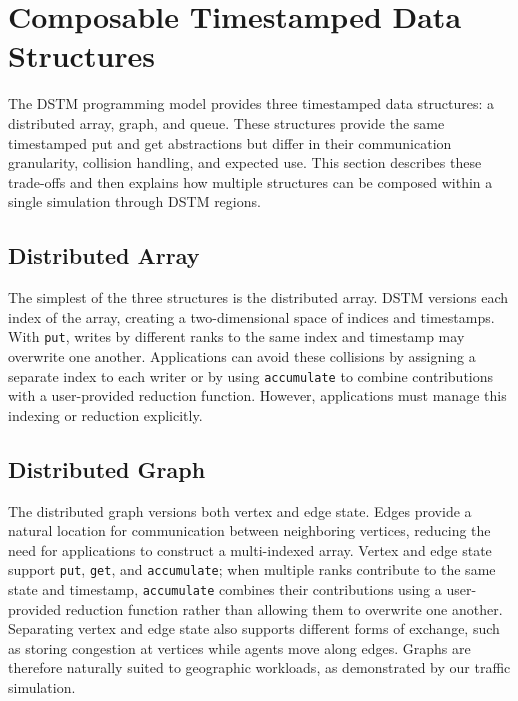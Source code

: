 \section{Composable Timestamped Data Structures}
The DSTM programming model provides three timestamped data structures:
a distributed array, graph, and queue. These structures provide the same
timestamped put and get abstractions but differ in their communication
granularity, collision handling, and expected use. This section describes
these trade-offs and then explains how multiple structures can be composed
within a single simulation through DSTM regions.

\subsection{Distributed Array}
The simplest of the three structures is the distributed array.
DSTM versions each index of the array, creating a two-dimensional
space of indices and timestamps. With \texttt{put}, writes by different
ranks to the same index and timestamp may overwrite one another.
Applications can avoid these collisions by assigning a separate index
to each writer or by using \texttt{accumulate} to combine contributions
with a user-provided reduction function. However, applications must
manage this indexing or reduction explicitly.

\subsection{Distributed Graph}
The distributed graph versions both vertex and edge state. Edges provide
a natural location for communication between neighboring vertices,
reducing the need for applications to construct a multi-indexed array.
Vertex and edge state support \texttt{put}, \texttt{get}, and
\texttt{accumulate}; when multiple ranks contribute to the same state
and timestamp, \texttt{accumulate} combines their contributions using a
user-provided reduction function rather than allowing them to overwrite
one another. Separating vertex and edge state also supports different
forms of exchange, such as storing congestion at vertices while agents
move along edges. Graphs are therefore naturally suited to geographic
workloads, as demonstrated by our traffic simulation.

